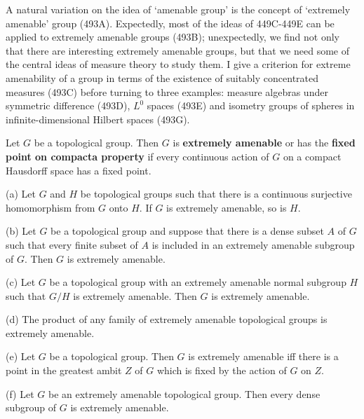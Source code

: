 
\def\Isom{\mathop{\text{Isom}}}

\def\chaptername{Further topics}
\def\sectionname{Extremely amenable groups}


A natural variation on the idea of `amenable group' is
the concept of
`extremely amenable' group (493A).   Expectedly, most of the ideas of
449C-449E %
can be applied to extremely amenable groups
(493B);  unexpectedly, we find not only that there are interesting
extremely amenable groups, but that we need some of the central ideas of
measure theory to study them.   I give a criterion for extreme
amenability of a group in terms of the existence of suitably
concentrated measures (493C) before turning to three examples:  measure
algebras under symmetric difference (493D), $L^0$ spaces (493E)
and isometry groups
of spheres in infinite-dimensional Hilbert spaces (493G).

 Let $G$ be a topological group.   Then $G$ is
{\bf extremely amenable} or has the {\bf fixed point on compacta
property} if every continuous action of $G$ on a compact
Hausdorff space has a fixed point.

 (a) Let $G$ and $H$ be topological groups
such that there is a continuous surjective homomorphism from $G$ onto
$H$.   If $G$ is extremely amenable, so is $H$.

(b) Let $G$ be a topological group and suppose that there is a dense
subset $A$ of $G$ such that every finite subset of $A$ is included in an
extremely amenable subgroup of $G$.    Then $G$ is extremely
amenable.

(c) Let $G$ be a topological group with an extremely amenable normal
subgroup $H$ such that $G/H$ is extremely amenable.   Then $G$ is
extremely amenable.

(d) The product of any family of extremely amenable topological groups
is extremely amenable.

(e) Let $G$ be a topological group.   Then $G$ is
extremely amenable iff there is a point in the greatest ambit $Z$ of
$G$ which is fixed by the action of $G$ on
$Z$.

(f) Let $G$ be an extremely amenable topological group.
Then every dense subgroup of $G$ is extremely amenable.

